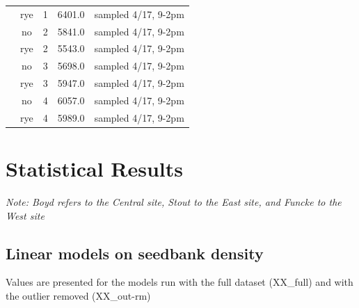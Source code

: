 \documentclass[
]{article}
\begin{document}
\begin{table}[H]
\begin{tabular}[t]{ccccc}
\rowcolor{gray!6}   & rye & 1 & 6401.0 & sampled 4/17, 9-2pm\\

 & no & 2 & 5841.0 & sampled 4/17, 9-2pm\\

\rowcolor{gray!6}   & rye & 2 & 5543.0 & sampled 4/17, 9-2pm\\

 & no & 3 & 5698.0 & sampled 4/17, 9-2pm\\

\rowcolor{gray!6}   & rye & 3 & 5947.0 & sampled 4/17, 9-2pm\\

 & no & 4 & 6057.0 & sampled 4/17, 9-2pm\\

\rowcolor{gray!6}  \multirow[t]{-8}{*}{\centering\arraybackslash West} & rye & 4 & 5989.0 & sampled 4/17, 9-2pm\\
\bottomrule
\end{tabular}
\end{table}

\newpage

\hypertarget{statistical-results}{%
\section{Statistical Results}\label{statistical-results}}

\emph{Note: Boyd refers to the Central site, Stout to the East site, and
Funcke to the West site}

\hypertarget{linear-models-on-seedbank-density}{%
\subsection{Linear models on seedbank
density}\label{linear-models-on-seedbank-density}}

Values are presented for the models run with the full dataset (XX\_full)
and with the outlier removed (XX\_out-rm)
\end{document}
